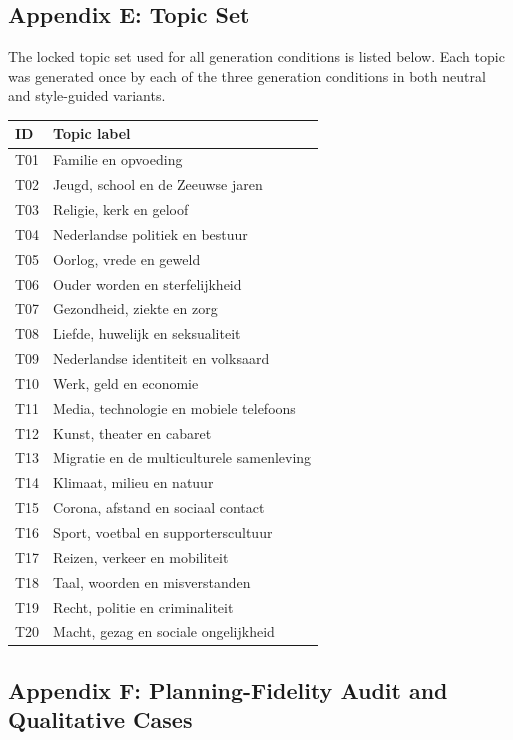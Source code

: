\documentclass[11pt]{article}
\begin{document}
\subsection{Appendix E: Topic Set}\label{appendix-e-topic-set}

The locked topic set used for all generation conditions is listed below. Each topic was generated once by each of the three generation conditions in both neutral and style-guided variants.

\begin{table}[t]\centering\scriptsize\begin{tabularx}{\textwidth}{YY}
\toprule\noalign{}
ID & Topic label \\
\midrule\noalign{}

\bottomrule\noalign{}

T01 & Familie en opvoeding \\
T02 & Jeugd, school en de Zeeuwse jaren \\
T03 & Religie, kerk en geloof \\
T04 & Nederlandse politiek en bestuur \\
T05 & Oorlog, vrede en geweld \\
T06 & Ouder worden en sterfelijkheid \\
T07 & Gezondheid, ziekte en zorg \\
T08 & Liefde, huwelijk en seksualiteit \\
T09 & Nederlandse identiteit en volksaard \\
T10 & Werk, geld en economie \\
T11 & Media, technologie en mobiele telefoons \\
T12 & Kunst, theater en cabaret \\
T13 & Migratie en de multiculturele samenleving \\
T14 & Klimaat, milieu en natuur \\
T15 & Corona, afstand en sociaal contact \\
T16 & Sport, voetbal en supporterscultuur \\
T17 & Reizen, verkeer en mobiliteit \\
T18 & Taal, woorden en misverstanden \\
T19 & Recht, politie en criminaliteit \\
T20 & Macht, gezag en sociale ongelijkheid \\
\end{tabularx}\end{table}

\subsection{Appendix F: Planning-Fidelity Audit and Qualitative Cases}\label{appendix-f-planning-fidelity-audit-and-qualitative-cases}
\end{document}
